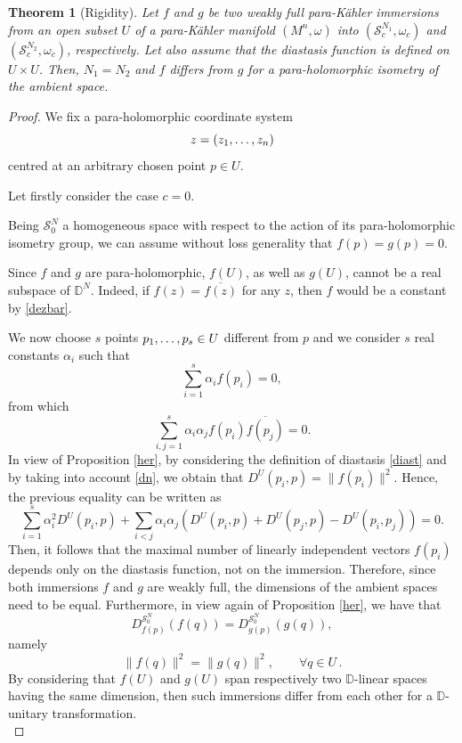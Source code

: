 \documentclass{article}
\newtheorem{thm}{Theorem}
\newcommand{\s}{\mathcal{S}}
\newcommand{\pk}{para-K\"ahler }
\newcommand{\D}{\mathds{D}}
\begin{document}
\begin{thm}[Rigidity]\label{rigidity}
Let $f$ and $g$ be  two weakly full \pk immersions from an open subset $U$ of a \pk manifold $(M^n,\omega)$ into $(\s_c^{N_1},\omega_c)$ and  $(\s_c^{N_2},\omega_c)$, respectively. Let also assume that
the diastasis function is defined on $U\times U$.  Then,  $N_1=N_2$ and 
$f$ differs from $g$ for a para-holomorphic isometry of the ambient space.
\end{thm}
\begin{proof}

\smallskip\noindent
We fix a para-holomorphic coordinate system 
$$z=(z_1,\mathellipsis,z_n)$$ centred at an arbitrary chosen point $p\in U$.

\smallskip
\noindent
Let firstly consider the case $c=0$.

\noindent
Being $\s_0^N$ a homogeneous space with respect to the action of its para-holomorphic isometry group, we can assume without loss generality that $f(p)=g(p)=0$.


\noindent
Since $f$ and $g$ are para-holomorphic, $f(U)$, as well as $g(U)$, cannot be  a real subspace of $\D^N$. Indeed, if $f(z)=\overline{f(z)}$ for any $z$, then $f$ would be a constant by \eqref{dezbar}. 

\noindent
We now choose $s$ points $p_1,\mathellipsis,p_s\in U$ different from $p$ and we consider $s$ real constants $\alpha_i$ such that
$$\sum_{i=1}^s \alpha_i f(p_i)=0,$$ 
from which
$$\sum_{i,j=1}^s \alpha_i\alpha_j f(p_i) \overline{ f(p_j)}=0.$$ 
In view of Proposition \ref{her}, by considering the definition of diastasis \eqref{diast} and by taking into account \eqref{dn},  we obtain that $D^{U}(p_i,p)=\|f(p_i)\|^2$. Hence, the previous equality can be written as
$$\sum_{i=1}^s \alpha_i^2 D^{U}(p_i,p)+\sum_{i<j} \alpha_i\alpha_j \left(D^{U}(p_i,p)+D^{U}(p_j,p)-D^{U}(p_i,p_j) \right) =0.$$ 
Then, it follows that the maximal number of linearly independent vectors $f(p_i)$ depends only on the diastasis function, not on the immersion.
Therefore, since both immersions $f$ and $g$ are weakly full,  the dimensions of the ambient spaces need to be equal.
%
Furthermore,  in view  again of Proposition \ref{her}, we have that
\begin{equation*}\label{diasteq}
D_{f(p)}^{\s_0^N}(f(q))=D_{g(p)}^{\s_0^N}(g(q)),\end{equation*}
namely
$$\|f(q)\|^2=\|g(q)\|^2, \qquad \forall q\in U\,.$$
By considering that $f(U)$ and $g(U)$ span respectively two $\D$-linear spaces having the same dimension, then such immersions differ from each other for a $\D$-unitary transformation.\\


\end{proof}
\end{document}
